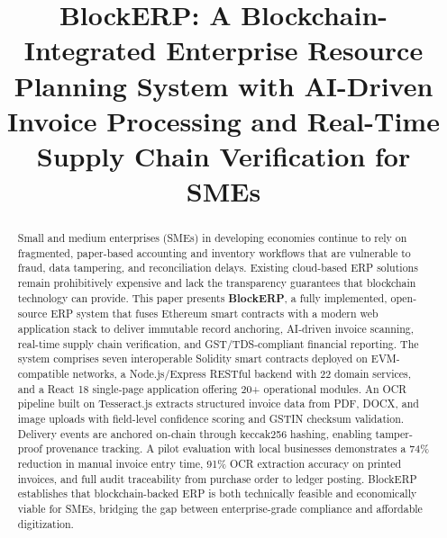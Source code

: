 \documentclass[conference]{IEEEtran}
\begin{document}
\title{BlockERP: A Blockchain-Integrated Enterprise Resource Planning System with AI-Driven Invoice Processing and Real-Time Supply Chain Verification for SMEs}

\author{
\and
{}
\and
{}
}

\maketitle

\begin{abstract}
Small and medium enterprises (SMEs) in developing economies continue to rely on fragmented, paper-based accounting and inventory workflows that are vulnerable to fraud, data tampering, and reconciliation delays. Existing cloud-based ERP solutions remain prohibitively expensive and lack the transparency guarantees that blockchain technology can provide. This paper presents \textbf{BlockERP}, a fully implemented, open-source ERP system that fuses Ethereum smart contracts with a modern web application stack to deliver immutable record anchoring, AI-driven invoice scanning, real-time supply chain verification, and GST/TDS-compliant financial reporting. The system comprises seven interoperable Solidity smart contracts deployed on EVM-compatible networks, a Node.js/Express RESTful backend with 22 domain services, and a React 18 single-page application offering 20+ operational modules. An OCR pipeline built on Tesseract.js extracts structured invoice data from PDF, DOCX, and image uploads with field-level confidence scoring and GSTIN checksum validation. Delivery events are anchored on-chain through keccak256 hashing, enabling tamper-proof provenance tracking. A pilot evaluation with local businesses demonstrates a 74\% reduction in manual invoice entry time, 91\% OCR extraction accuracy on printed invoices, and full audit traceability from purchase order to ledger posting. BlockERP establishes that blockchain-backed ERP is both technically feasible and economically viable for SMEs, bridging the gap between enterprise-grade compliance and affordable digitization.
\end{abstract}
\end{document}
